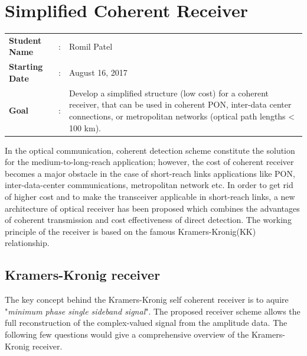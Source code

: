 \clearpage
\section{Simplified Coherent Receiver}

\begin{tcolorbox}	
\begin{tabular}{p{2.75cm} p{0.2cm} p{10.5cm}} 	
\textbf{Student Name}  &:& Romil Patel\\
\textbf{Starting Date} &:& August 16, 2017\\
\textbf{Goal}          &:& Develop a simplified structure (low cost) for a coherent receiver, that can be used in coherent PON, inter-data center connections, or metropolitan networks (optical path lengths < 100 km).
\end{tabular}
\end{tcolorbox}

In the optical communication, coherent detection scheme constitute the solution for the medium-to-long-reach application; however, the cost of coherent receiver becomes a major obstacle in the case of short-reach links applications like PON, inter-data-center communications, metropolitan network etc. In order to get rid of higher cost and to make the transceiver applicable in short-reach links, a new architecture of optical receiver has been proposed which combines the advantages of coherent transmission and cost effectiveness of direct detection. The working principle of the receiver is based on the famous Kramers-Kronig(KK) relationship. 
\subsection{Kramers-Kronig receiver }
The key concept behind the Kramers-Kronig self coherent receiver is to aquire "\textit{minimum phase single sideband signal}". The proposed receiver scheme allows the full reconstruction of the complex-valued signal from the amplitude data. The following few questions would give a comprehensive overview of the Kramers-Kronig receiver.

